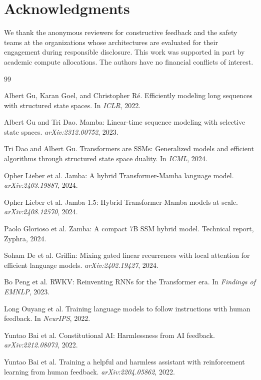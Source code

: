 \documentclass{article}
\begin{document}
\section*{Acknowledgments}

We thank the anonymous reviewers for constructive feedback and the safety teams at the organizations whose architectures are evaluated for their engagement during responsible disclosure. This work was supported in part by academic compute allocations. The authors have no financial conflicts of interest.

\begin{thebibliography}{99}

Albert Gu, Karan Goel, and Christopher R\'{e}.
Efficiently modeling long sequences with structured state spaces.
In \emph{ICLR}, 2022.

Albert Gu and Tri Dao.
Mamba: Linear-time sequence modeling with selective state spaces.
\emph{arXiv:2312.00752}, 2023.

Tri Dao and Albert Gu.
Transformers are SSMs: Generalized models and efficient algorithms through structured state space duality.
In \emph{ICML}, 2024.

Opher Lieber et al.
Jamba: A hybrid Transformer-Mamba language model.
\emph{arXiv:2403.19887}, 2024.

Opher Lieber et al.
Jamba-1.5: Hybrid Transformer-Mamba models at scale.
\emph{arXiv:2408.12570}, 2024.

Paolo Glorioso et al.
Zamba: A compact 7B SSM hybrid model.
Technical report, Zyphra, 2024.

Soham De et al.
Griffin: Mixing gated linear recurrences with local attention for efficient language models.
\emph{arXiv:2402.19427}, 2024.

Bo Peng et al.
RWKV: Reinventing RNNs for the Transformer era.
In \emph{Findings of EMNLP}, 2023.

Long Ouyang et al.
Training language models to follow instructions with human feedback.
In \emph{NeurIPS}, 2022.

Yuntao Bai et al.
Constitutional AI: Harmlessness from AI feedback.
\emph{arXiv:2212.08073}, 2022.

Yuntao Bai et al.
Training a helpful and harmless assistant with reinforcement learning from human feedback.
\emph{arXiv:2204.05862}, 2022.


\end{thebibliography}
\end{document}
